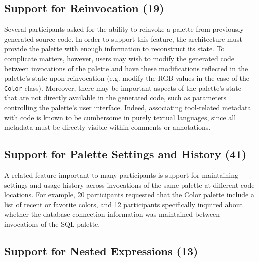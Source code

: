 \documentclass[10pt, conference, compsocconf]{IEEEtran}
\begin{document}
\subsection{Support for Reinvocation (19)}
Several participants asked for the ability to reinvoke a palette from previously generated source code. In order to support this feature, the architecture must provide the palette with enough information to reconstruct its state. To complicate matters, however, users may wish to modify the generated code between invocations of the palette and have these modifications reflected in the palette's state upon reinvocation (e.g. modify the RGB values in the case of the \verb|Color| class). Moreover, there may be important aspects of the palette's state that are not directly available in the generated code, such as parameters controlling the palette's user interface. Indeed, associating tool-related metadata with code is known to be cumbersome in purely textual languages, since all metadata must be directly visible within comments or annotations. 
 
\subsection{Support for Palette Settings and History (41)}

A related feature important to many participants is support for maintaining settings and usage history across invocations of the same palette at different code locations. For example, 20 participants requested that the Color palette include a list of recent or favorite colors, and 12 participants specifically inquired about whether the database connection information was maintained between invocations of the SQL palette. 



\subsection{Support for Nested Expressions (13)}
\end{document}
